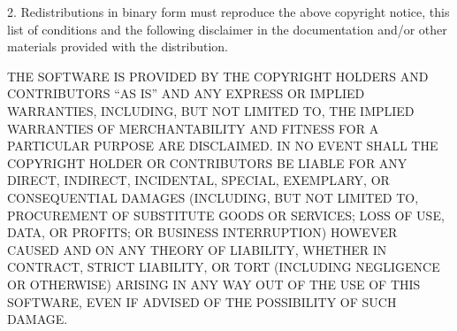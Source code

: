 \documentclass{article}
\begin{document}
    2. Redistributions in binary form must reproduce the above copyright notice, 
       this list of conditions and the following disclaimer in the documentation 
       and/or other materials provided with the distribution.

    THE SOFTWARE IS PROVIDED BY THE COPYRIGHT HOLDERS AND CONTRIBUTORS “AS IS” 
    AND ANY EXPRESS OR IMPLIED WARRANTIES, INCLUDING, BUT NOT LIMITED TO, THE 
    IMPLIED WARRANTIES OF MERCHANTABILITY AND FITNESS FOR A PARTICULAR PURPOSE ARE 
    DISCLAIMED. IN NO EVENT SHALL THE COPYRIGHT HOLDER OR CONTRIBUTORS BE LIABLE 
    FOR ANY DIRECT, INDIRECT, INCIDENTAL, SPECIAL, EXEMPLARY, OR CONSEQUENTIAL 
    DAMAGES (INCLUDING, BUT NOT LIMITED TO, PROCUREMENT OF SUBSTITUTE GOODS OR 
    SERVICES; LOSS OF USE, DATA, OR PROFITS; OR BUSINESS INTERRUPTION) HOWEVER 
    CAUSED AND ON ANY THEORY OF LIABILITY, WHETHER IN CONTRACT, STRICT LIABILITY, 
    OR TORT (INCLUDING NEGLIGENCE OR OTHERWISE) ARISING IN ANY WAY OUT OF THE USE 
    OF THIS SOFTWARE, EVEN IF ADVISED OF THE POSSIBILITY OF SUCH DAMAGE.
\end{document}
